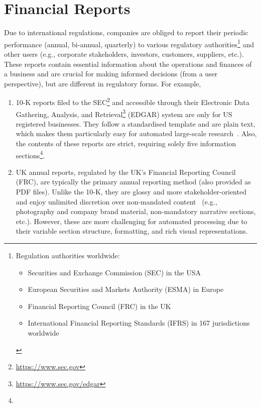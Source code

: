 \section{Financial Reports} \label{sec:financial_reports}
Due to international regulations, companies are obliged to report their periodic performance (annual, bi-annual, quarterly) to various regulatory authorities\footnote{Regulation authorities worldwide:
    \begin{itemize}
        \item Securities and Exchange Commission (SEC) in the USA
        \item European Securities and Markets Authority (ESMA) in Europe
        \item Financial Reporting Council (FRC) in the UK
        \item International Financial Reporting Standards (IFRS) in 167 jurisdictions worldwide
    \end{itemize}
    } and other users (e.g., corporate stakeholders, investors, customers, suppliers, etc.).
    These reports contain essential information about the operations and finances of a business and are crucial for making informed decisions (from a user perspective), but are different in regulatory forms.
    For example,
\begin{enumerate}
    \item 10-K reports filed to the SEC\footnote{\url{https://www.sec.gov}} and accessible through their Electronic Data Gathering, Analysis, and Retrieval\footnote{\url{https://www.sec.gov/edgar}} (EDGAR) system are only for US registered businesses.
    They follow a standardised template and are plain text, which makes them particularly easy for automated large-scale research~\cite{el-haj2019retrieving}.
    Also, the contents of these reports are strict, requiring solely five information sections\footnote{
    }.
    \item UK annual reports, regulated by the UK's Financial Reporting Council (FRC), are typically the primary annual reporting method (also provided as PDF files).
    Unlike the 10-K, they are glossy and more stakeholder-oriented and enjoy unlimited discretion over non-mandated content~\cite{el-haj2019retrieving} (e.g., photography and company brand material, non-mandatory narrative sections, etc.).
    However, these are more challenging for automated processing due to their variable section structure, formatting, and rich visual representations.
\end{enumerate}


